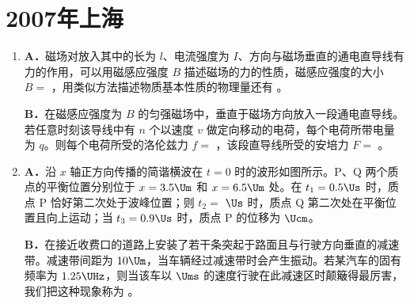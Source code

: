 \documentclass[\gkver]{gaokaozhenti}
\begin{document}
\chapter{2007年上海}

\begin{enumerate}
\item
\textbf{A．}磁场对放入其中的长为 $l$、电流强度为 $I$、方向与磁场垂直的通电直导线有力的作用，可以用磁感应强度 $B$ 描述磁场的力的性质，磁感应强度的大小 $B=$ ，用类似方法描述物质基本性质的物理量还有 。

\textbf{B．}在磁感应强度为 $B$ 的匀强磁场中，垂直于磁场方向放入一段通电直导线。若任意时刻该导线中有 $n$ 个以速度 $v$ 做定向移动的电荷，每个电荷所带电量为 $q$。则每个电荷所受的洛伦兹力 $f=$ ，该段直导线所受的安培力 $F=$ 。



\item
\textbf{A．}沿 $x$ 轴正方向传播的简谐横波在 $t=0$ 时的波形如图所示。P、Q 两个质点的平衡位置分别位于 $x=3.5\Um$ 和 $x=6.5\Um$ 处。在 $t_{1}=0.5\Us$ 时，质点 P 恰好第二次处于波峰位置；则 $t_{2}=$  $\Us$ 时，质点 Q 第二次处在平衡位置且向上运动；当 $t_{3}=0.9\Us$ 时，质点 P 的位移为  $\Ucm$。

\onepicture[align=right, w=6.86cm]{}

\textbf{B．}在接近收费口的道路上安装了若干条突起于路面且与行驶方向垂直的减速带。减速带间距为 $10\Um$，当车辆经过减速带时会产生振动。若某汽车的固有频率为 $1.25\UHz$，则当该车以  $\Ums$ 的速度行驶在此减速区时颠簸得最厉害，我们把这种现象称为 。


\end{enumerate}
\end{document}
